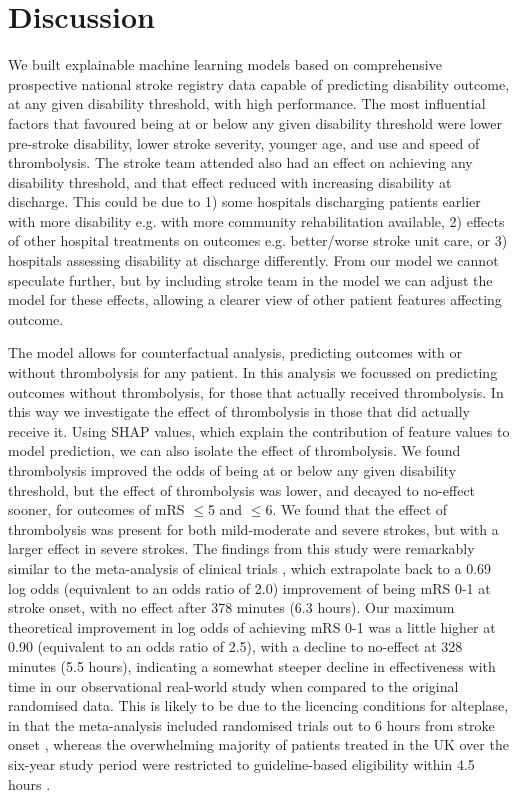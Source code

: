 \section{Discussion}



We built explainable machine learning models based on comprehensive prospective national stroke registry data capable of predicting disability outcome, at any given disability threshold, with high performance. The most influential factors that favoured being at or below any given disability threshold were lower pre-stroke disability, lower stroke severity, younger age, and use and speed of thrombolysis. The stroke team attended also had an effect on achieving any disability threshold, and that effect reduced with increasing disability at discharge. This could be due to 1) some hospitals discharging patients earlier with more disability e.g. with more community rehabilitation available, 2) effects of other hospital treatments on outcomes e.g. better/worse stroke unit care, or 3) hospitals assessing disability at discharge differently. From our model we cannot speculate further, but by including stroke team in the model we can adjust the model for these effects, allowing a clearer view of other patient features affecting outcome.

The model allows for counterfactual analysis, predicting outcomes with or without thrombolysis for any patient. In this analysis we focussed on predicting outcomes without thrombolysis, for those that actually received thrombolysis. In this way we investigate the effect of thrombolysis in those that did actually receive it. Using SHAP values, which explain the contribution of feature values to model prediction, we can also isolate the effect of thrombolysis. We found thrombolysis improved the odds of being at or below any given disability threshold, but the effect of thrombolysis was lower, and decayed to no-effect sooner, for outcomes of mRS $\leq$5 and $\leq$6. We found that the effect of thrombolysis was present for both mild-moderate and severe strokes, but with a larger effect in severe strokes. The findings from this study were remarkably similar to the meta-analysis of clinical trials \cite{emberson_effect_2014}, which extrapolate back to a 0.69 log odds (equivalent to an odds ratio of 2.0) improvement of being mRS 0-1 at stroke onset, with no effect after 378 minutes (6.3 hours). Our maximum theoretical improvement in log odds of achieving mRS 0-1 was a little higher at 0.90 (equivalent to an odds ratio of 2.5), with a decline to no-effect at 328 minutes (5.5 hours), indicating a somewhat steeper decline in effectiveness with time in our observational real-world study when compared to the original randomised data.  This is likely to be due to the licencing conditions for alteplase, in that the meta-analysis included randomised trials out to 6 hours from stroke onset \cite{emberson_effect_2014}, whereas the overwhelming majority of patients treated in the UK over the six-year study period were restricted to guideline-based eligibility within 4.5 hours \cite{intercollegiate_stroke_working_party_national_2016}.

